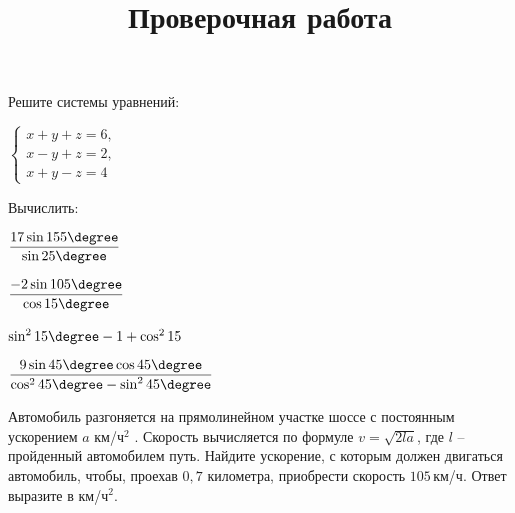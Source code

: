 \newpage
\title{Проверочная работа}
\begin{listofex}
	\item Решите системы уравнений:
	\begin{enumcols}[itemcolumns=3]
	\item {}
	\item {}
	\item \( \left\{
	\begin{array}{l}
		x+y+z=6,\\
		x-y+z=2,\\
		x+y-z=4
	\end{array}
	\right. \)
	\end{enumcols}
	\item Вычислить:
	\begin{enumcols}[itemcolumns=2]
		\item \( \dfrac{17\sin155\degree}{\sin25\degree} \)
		\item \( \dfrac{-2\sin105\degree}{\cos15\degree} \)
		\item \( \sin^215\degree-1+\cos^215 \)
		\item \( \dfrac{9\sin45\degree\cos45\degree}{\cos^245\degree-\sin^245\degree} \)
	\end{enumcols}
	\item {}
	\item Автомобиль разгоняется на прямолинейном участке шоссе с постоянным ускорением \( a \) км/ч\( ^2 \) . Скорость вычисляется по формуле \( v=\sqrt{2la} \), где \( l \) -- пройденный автомобилем путь. Найдите ускорение, с которым должен двигаться автомобиль, чтобы, проехав \( 0,7 \) километра, приобрести скорость \( 105 \) км/ч. Ответ выразите в км/ч\( ^2 \).
	\item {}
	\item {}
	\item {}
\end{listofex}